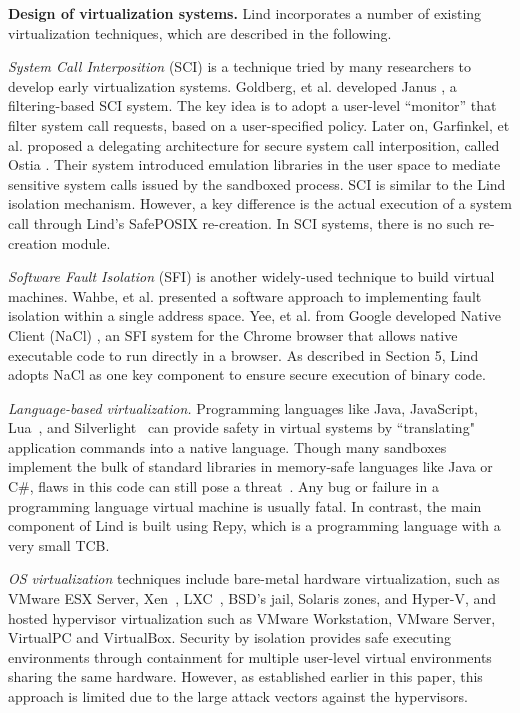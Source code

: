 
\textbf{Design of virtualization systems.}
Lind incorporates a number of existing virtualization techniques, which are
described in the following.

\textit{System Call Interposition} (SCI) is a technique tried by many researchers
to develop early virtualization systems.
Goldberg, et al. developed Janus \cite{Janus0:96, Janus:99}, a filtering-based SCI system.
The key idea is to adopt a user-level ``monitor'' that filter system call requests, based on
a user-specified policy. Later on, Garfinkel, et al. proposed a delegating architecture for secure system call interposition,
called Ostia \cite{SCI-04}. Their system introduced emulation libraries in the user space
to mediate sensitive system calls issued by the sandboxed process. SCI is similar to
 the Lind isolation mechanism. However, a key difference is the actual execution
of a system call through Lind's SafePOSIX re-creation.
In SCI systems, there is no such re-creation module.

\textit{Software Fault Isolation} (SFI) is another widely-used technique
to build virtual machines.
Wahbe, et al. \cite{SFI:93} presented a software approach to implementing
fault isolation within a single address space.
Yee, et al. from Google developed Native Client (NaCl) \cite{NaCl-09},
an SFI system for the Chrome browser that allows native executable code to run directly in a
browser. As described in Section 5, Lind adopts NaCl as one key component to ensure secure execution
of binary code.

\textit{Language-based virtualization.}
Programming languages like Java, JavaScript, Lua~\cite{Lua}, and
Silverlight~\cite{Silverlight} can provide safety in virtual systems by
``translating" application commands into a native language.
%
Though many sandboxes implement the bulk of standard libraries in
memory-safe languages like Java or C\#, flaws in this code can
still pose a threat~\cite{JavaBugs, Java-Lessons}.
Any bug or failure in a programming language virtual
machine is usually fatal. In contrast, the main component of Lind
is built using Repy, which is a programming language with a very small TCB.

\textit{OS virtualization}
techniques include
bare-metal hardware virtualization, such as VMware ESX Server, Xen~\cite{Xen-03},
LXC~\cite{LXC}, BSD's jail, Solaris zones, and Hyper-V, and
hosted hypervisor virtualization such as VMware
Workstation, VMware Server, VirtualPC and VirtualBox.
Security by isolation \cite{Qubes, Overshadow, SecureVM, HypSec}
provides safe executing environments through containment for multiple
user-level virtual environments sharing the same hardware.
However, as established earlier in this paper, this approach is limited due to
the large attack vectors against the hypervisors.

